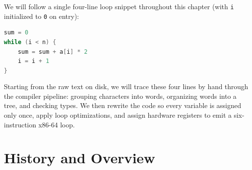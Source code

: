 We will follow a single four-line loop snippet throughout this chapter (with \texttt{i} initialized to \texttt{0} on entry):
\begin{lstlisting}[language=C]
sum = 0
while (i < n) {
    sum = sum + a[i] * 2
    i = i + 1
}
\end{lstlisting}
Starting from the raw text on disk, we will trace these four lines by hand
through the compiler pipeline: grouping characters into words, organizing words into a tree,
and checking types. We then rewrite the code so every variable is assigned only once,
apply loop optimizations, and assign hardware registers to emit a six-instruction x86-64 loop.

\chapterline

\section{History and Overview}
\label{ch41:setup}

